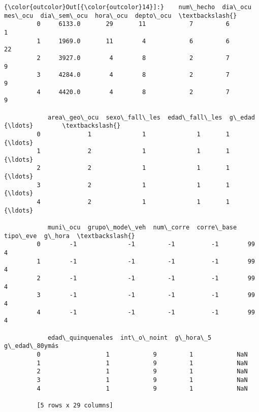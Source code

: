 \documentclass[11pt]{article}
\begin{document}
\begin{Verbatim}[commandchars=\\\{\}]
{\color{outcolor}Out[{\color{outcolor}14}]:}    num\_hecho  dia\_ocu  mes\_ocu  dia\_sem\_ocu  hora\_ocu  depto\_ocu  \textbackslash{}
         0     6133.0       29       11            7         6          1   
         1     1969.0       11        4            6         6         22   
         2     3927.0        4        8            2         7          9   
         3     4284.0        4        8            2         7          9   
         4     4420.0        4        8            2         7          9   
         
            area\_geo\_ocu  sexo\_fall\_les  edad\_fall\_les  g\_edad      {\ldots}        \textbackslash{}
         0             1              1              1       1      {\ldots}         
         1             2              1              1       1      {\ldots}         
         2             2              1              1       1      {\ldots}         
         3             2              1              1       1      {\ldots}         
         4             2              1              1       1      {\ldots}         
         
            muni\_ocu  grupo\_mode\_veh  num\_corre  corre\_base  tipo\_eve  g\_hora  \textbackslash{}
         0        -1              -1         -1          -1        99       4   
         1        -1              -1         -1          -1        99       4   
         2        -1              -1         -1          -1        99       4   
         3        -1              -1         -1          -1        99       4   
         4        -1              -1         -1          -1        99       4   
         
            edad\_quinquenales  int\_o\_noint  g\_hora\_5  g\_edad\_80ymás  
         0                  1            9         1            NaN  
         1                  1            9         1            NaN  
         2                  1            9         1            NaN  
         3                  1            9         1            NaN  
         4                  1            9         1            NaN  
         
         [5 rows x 29 columns]
\end{Verbatim}
            
\end{document}
